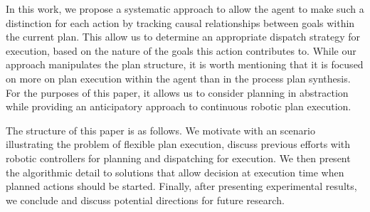 In this work, we propose a systematic approach to allow the agent to
make such a distinction for each action by tracking causal
relationships between goals within the current plan. This allow us to
determine an appropriate dispatch strategy for execution, based on the
nature of the goals this action contributes to. While our approach
manipulates the plan structure, it is worth mentioning that it is
focused on more on plan execution within the agent than in the process
plan synthesis.  For the purposes of this paper, it allows us to
consider planning in abstraction while providing an anticipatory
approach to continuous robotic plan execution.

The structure of this paper is as follows. We motivate with an
scenario illustrating the problem of flexible plan execution, discuss
previous efforts with robotic controllers for planning and dispatching
for execution. We then present the algorithmic detail to solutions
that allow decision at execution time when planned actions should be
started. Finally, after presenting experimental results, we conclude
and discuss potential directions for future research.

